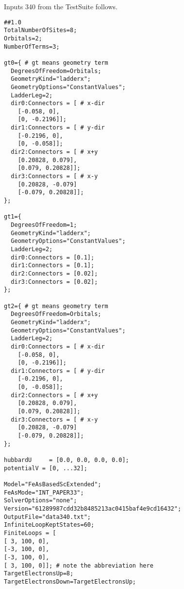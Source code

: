 \documentclass[twocolumn]{article}
\begin{document}
Inputs 340 from the TestSuite follows.
\begin{tiny}
\begin{verbatim}
##1.0
TotalNumberOfSites=8;
Orbitals=2;
NumberOfTerms=3;

gt0={ # gt means geometry term
  DegreesOfFreedom=Orbitals;
  GeometryKind="ladderx";
  GeometryOptions="ConstantValues";
  LadderLeg=2;
  dir0:Connectors = [ # x-dir
    [-0.058, 0],
    [0, -0.2196]];
  dir1:Connectors = [ # y-dir
    [-0.2196, 0],
    [0, -0.058]];
  dir2:Connectors = [ # x+y
    [0.20828, 0.079],
    [0.079, 0.20828]];
  dir3:Connectors = [ # x-y
    [0.20828, -0.079]
    [-0.079, 0.20828]];
};

gt1={
  DegreesOfFreedom=1;
  GeometryKind="ladderx";
  GeometryOptions="ConstantValues";
  LadderLeg=2;
  dir0:Connectors = [0.1];
  dir1:Connectors = [0.1];
  dir2:Connectors = [0.02];
  dir3:Connectors = [0.02];
};

gt2={ # gt means geometry term
  DegreesOfFreedom=Orbitals;
  GeometryKind="ladderx";
  GeometryOptions="ConstantValues";
  LadderLeg=2;
  dir0:Connectors = [ # x-dir
    [-0.058, 0],
    [0, -0.2196]];
  dir1:Connectors = [ # y-dir
    [-0.2196, 0],
    [0, -0.058]];
  dir2:Connectors = [ # x+y
    [0.20828, 0.079],
    [0.079, 0.20828]];
  dir3:Connectors = [ # x-y
    [0.20828, -0.079]
    [-0.079, 0.20828]];
};

hubbardU	 = [0.0, 0.0, 0.0, 0.0];
potentialV = [0, ...32];

Model="FeAsBasedScExtended";
FeAsMode="INT_PAPER33";
SolverOptions="none";
Version="61289987cdd32b8485213ac0415baf4e9cd16432";
OutputFile="data340.txt";
InfiniteLoopKeptStates=60;
FiniteLoops = [
[ 3, 100, 0],
[-3, 100, 0],
[-3, 100, 0],
[ 3, 100, 0]]; # note the abbreviation here
TargetElectronsUp=8;
TargetElectronsDown=TargetElectronsUp;
\end{verbatim}
\end{tiny}
\end{document}

